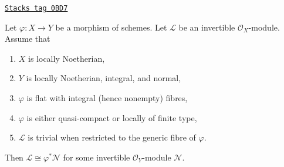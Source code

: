 \begin{lemma}
\label{divisors-lemma-in-image-pullback}
\href{https://stacks.math.columbia.edu/tag/0BD7}{\texttt{Stacks tag 0BD7}}

Let $\varphi : X \to Y$ be a morphism of schemes. Let $\mathcal{L}$
be an invertible $\mathcal{O}_X$-module. Assume that
\begin{enumerate}
\item $X$ is locally Noetherian,
\item $Y$ is locally Noetherian, integral, and normal,
\item $\varphi$ is flat with integral (hence nonempty) fibres,
\item $\varphi$ is either quasi-compact or locally of finite type,
\item $\mathcal{L}$ is trivial when restricted to the generic fibre of
$\varphi$.
\end{enumerate}
Then $\mathcal{L} \cong \varphi^*\mathcal{N}$ for some invertible
$\mathcal{O}_Y$-module $\mathcal{N}$.
\end{lemma}

